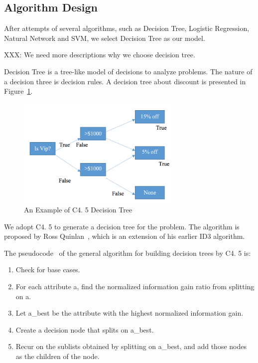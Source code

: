\subsection{Algorithm Design}

After attempts of several algorithms, such as Decision Tree, Logistic Regression, Natural Network and SVM, we select Decision Tree as our model.
 

XXX: We need more descriptions why we choose decision tree.


Decision Tree is a tree-like model of decisions to analyze problems.
 The nature of a decision three is decision rules.
 A decision tree about discount is presented in Figure~\ref{fig:ctree}.


\begin{figure}[!htbp]
\centering
\includegraphics[width=8.0cm]{ctree.png} 
\newline
\caption{An Example of C4.
5 Decision Tree}
\label{fig:ctree} 
\end{figure}

We adopt C4.
5 to generate a decision tree for the problem.
 The algorithm is proposed by Ross Quinlan~\cite{quinlan}, which is an extension of his earlier ID3 algorithm.

The pseudocode~\cite{Kotsiantis} of the general algorithm for building decision trees by C4.
5 is: 

\begin{enumerate}
\item Check for base cases.

\item For each attribute a, find the normalized information gain ratio from splitting on a.

\item Let a\_best be the attribute with the highest normalized information gain.

\item Create a decision node that splits on a\_best.

\item Recur on the sublists obtained by splitting on a\_best, and add those nodes as the children of the node.

\end{enumerate}


